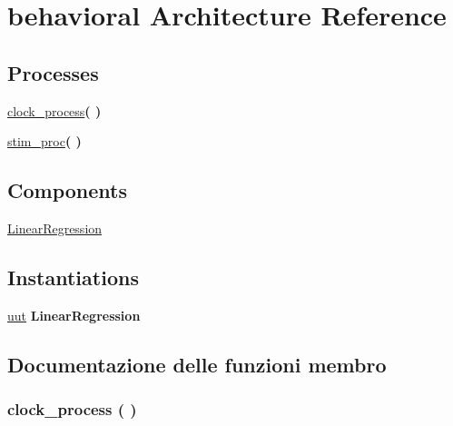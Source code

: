 \hypertarget{classautomatic__tb_1_1behavioral}{}\section{behavioral Architecture Reference}
\label{classautomatic__tb_1_1behavioral}
\subsection*{Processes}
 \begin{DoxyCompactItemize}
\item 
\hyperlink{classautomatic__tb_1_1behavioral_ac0731c1f0a226305f2a590b4044cdccb}{clock\+\_\+process}{\bfseries  (  )}
\item 
\hyperlink{classautomatic__tb_1_1behavioral_ad2efa6785cff833c341e27596b21aeb5}{stim\+\_\+proc}{\bfseries  (  )}
\end{DoxyCompactItemize}
\subsection*{Components}
 \begin{DoxyCompactItemize}
\item 
\hyperlink{classautomatic__tb_1_1behavioral_a899499ba78b32b936cd0914831a72c95}{Linear\+Regression}  {\bfseries }  
\end{DoxyCompactItemize}
\subsection*{Instantiations}
 \begin{DoxyCompactItemize}
\item 
\hyperlink{classautomatic__tb_1_1behavioral_a1619316ad715601eb5d3559db829ac05}{uut}  {\bfseries Linear\+Regression}   
\end{DoxyCompactItemize}


\subsection{Documentazione delle funzioni membro}
\subsubsection[{\texorpdfstring{clock\+\_\+process}{clock_process}}]{\setlength{\rightskip}{0pt plus 5cm} {\bfseries \textcolor{vhdlchar}{ }} clock\+\_\+process ( ) \hspace{0.3cm}{\ttfamily [Process]}}\hypertarget{classautomatic__tb_1_1behavioral_ac0731c1f0a226305f2a590b4044cdccb}{}\label{classautomatic__tb_1_1behavioral_ac0731c1f0a226305f2a590b4044cdccb}
